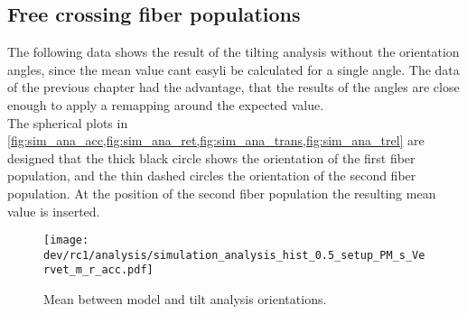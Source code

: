 \subsection{Free crossing fiber populations}
\label{sec:resFreeCross}
% 
The following data shows the result of the tilting analysis without the orientation angles, since the mean value cant easyli be calculated for a single angle. 
The data of the previous chapter had the advantage, that the results of the angles are close enough to apply a remapping around the expected value.
\\
% 
The spherical plots in \cref{fig:sim_ana_acc,fig:sim_ana_ret,fig:sim_ana_trans,fig:sim_ana_trel} are designed that the thick black circle shows the orientation of the first fiber population, and the thin dashed circles the orientation of the second fiber population. 
At the position of the second fiber population the resulting mean value is inserted.
% 
% 
% 
\begin{figure}[!p]
\centering
\texttt{[image: dev/rc1/analysis/simulation\_analysis\_hist\_0.5\_setup\_PM\_s\_Vervet\_m\_r\_acc.pdf]}
\caption[Simulation acc]{Mean \acc{} between model and tilt analysis orientations.}
\label{fig:sim_ana_acc}
\end{figure}
% 
